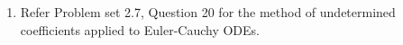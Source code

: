 \begin{enumerate}
\begin{enumerate}
              \item Refer Problem set 2.7, Question 20 for the method of undetermined coefficients
              applied to Euler-Cauchy ODEs.
          \end{enumerate}
\end{enumerate}
